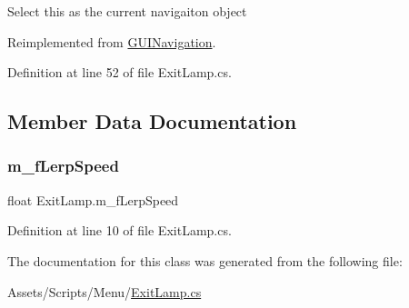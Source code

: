 Select this as the current navigaiton object 



Reimplemented from \mbox{\hyperlink{class_g_u_i_navigation_a4c40fc7986ac35247bc8f77c615e7847}{G\+U\+I\+Navigation}}.



Definition at line 52 of file Exit\+Lamp.\+cs.



\subsection{Member Data Documentation}
\mbox{\label{class_exit_lamp_a806e871e931e56c429bcd5b32fcb73a0}} 
\subsubsection{\texorpdfstring{m\+\_\+f\+Lerp\+Speed}{m\_fLerpSpeed}}
{\footnotesize\ttfamily float Exit\+Lamp.\+m\+\_\+f\+Lerp\+Speed}



Definition at line 10 of file Exit\+Lamp.\+cs.



The documentation for this class was generated from the following file\+:\begin{DoxyCompactItemize}
\item 
Assets/\+Scripts/\+Menu/\mbox{\hyperlink{_exit_lamp_8cs}{Exit\+Lamp.\+cs}}\end{DoxyCompactItemize}
